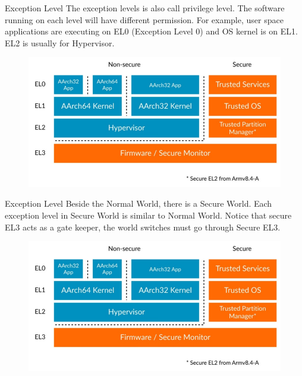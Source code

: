 \documentclass{beamer}
\begin{document}
\begin{frame}{Exception Level}
    The exception levels is also call privilege level. The software running on each level will have different permission. For example, user space applications are executing on EL0 (Exception Level 0) and OS kernel is on EL1. EL2 is usually for Hypervisor.
    \begin{figure}
        \centering
        \includegraphics[scale=.30]{SUSTech-Beamer-Theme/pic/image.png}
        \label{fig:my_label}
    \end{figure}
\end{frame}

\begin{frame}{Exception Level}
    Beside the Normal World, there is a Secure World. Each exception level in Secure World is similar to Normal World. Notice that secure EL3 acts as a gate keeper, the world switches must go through Secure EL3.
    \begin{figure}
        \centering
        \includegraphics[scale=.30]{SUSTech-Beamer-Theme/pic/image.png}
        \label{fig:my_label}
    \end{figure}
\end{frame}
\end{document}
